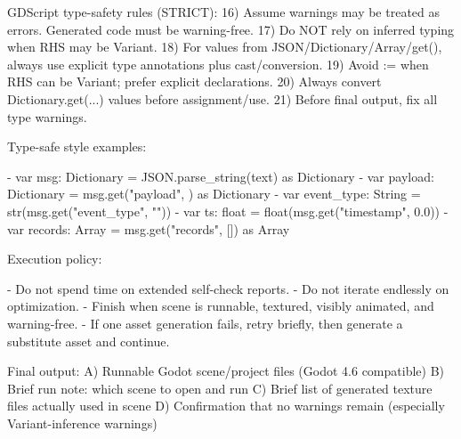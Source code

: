 \begin{promptbox}
GDScript type-safety rules (STRICT):
16) Assume warnings may be treated as errors. Generated code must be warning-free.
17) Do NOT rely on inferred typing when RHS may be Variant.
18) For values from JSON/Dictionary/Array/get(), always use explicit type annotations plus cast/conversion.
19) Avoid := when RHS can be Variant; prefer explicit declarations.
20) Always convert Dictionary.get(...) values before assignment/use.
21) Before final output, fix all type warnings.

Type-safe style examples:

- var msg: Dictionary = JSON.parse_string(text) as Dictionary
- var payload: Dictionary = msg.get("payload", {}) as Dictionary
- var event_type: String = str(msg.get("event_type", ""))
- var ts: float = float(msg.get("timestamp", 0.0))
- var records: Array = msg.get("records", []) as Array

Execution policy:

- Do not spend time on extended self-check reports.
- Do not iterate endlessly on optimization.
- Finish when scene is runnable, textured, visibly animated, and warning-free.
- If one asset generation fails, retry briefly, then generate a substitute asset and continue.

Final output:
A) Runnable Godot scene/project files (Godot 4.6 compatible)
B) Brief run note: which scene to open and run
C) Brief list of generated texture files actually used in scene
D) Confirmation that no warnings remain (especially Variant-inference warnings)
\end{promptbox}